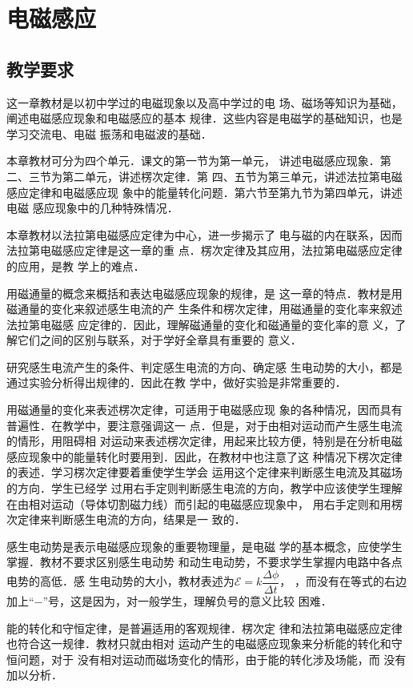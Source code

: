 \chapter{电磁感应}
\minitoc[n]
\section{教学要求}
这一章教材是以初中学过的电磁现象以及高中学过的电
场、磁场等知识为基础，阐述电磁感应现象和电磁感应的基本
规律．这些内容是电磁学的基础知识，也是学习交流电、电磁
振荡和电磁波的基础．

本章教材可分为四个单元．课文的第一节为第一单元，
讲述电磁感应现象．第二、三节为第二单元，讲述楞次定律．第
四、五节为第三单元，讲述法拉第电磁感应定律和电磁感应现
象中的能量转化问题．第六节至第九节为第四单元，讲述电磁
感应现象中的几种特殊情况．

本章教材以法拉第电磁感应定律为中心，进一步揭示了
电与磁的内在联系，因而法拉第电磁感应定律是这一章的重
点．楞次定律及其应用，法拉第电磁感应定律的应用，是教
学上的难点．

用磁通量的概念来概括和表达电磁感应现象的规律，是
这一章的特点．教材是用磁通量的变化来叙述感生电流的产
生条件和楞次定律，用磁通量的变化率来叙述法拉第电磁感
应定律的．因此，理解磁通量的变化和磁通量的变化率的意
义，了解它们之间的区别与联系，对于学好全章具有重要的
意义．

研究感生电流产生的条件、判定感生电流的方向、确定感
生电动势的大小，都是通过实验分析得出规律的．因此在教
学中，做好实验是非常重要的．

用磁通量的变化来表述楞次定律，可适用于电磁感应现
象的各种情况，因而具有普遍性．在教学中，要注意强调这一
点．但是，对于由相对运动而产生感生电流的情形，用阻碍相
对运动来表述楞次定律，用起来比较方便，特别是在分析电磁
感应现象中的能量转化时要用到．因此，在教材中也注意了这
种情况下楞次定律的表述．学习楞次定律要着重使学生学会
运用这个定律来判断感生电流及其磁场的方向．学生已经学
过用右手定则判断感生电流的方向，教学中应该使学生理解
在由相对运动（导体切割磁力线）而引起的电磁感应现象中，
用右手定则和用楞次定律来判断感生电流的方向，结果是一
致的．

感生电动势是表示电磁感应现象的重要物理量，是电磁
学的基本概念，应使学生掌握．教材不要求区别感生电动势
和动生电动势，不要求学生掌握内电路中各点电势的高低．感
生电动势的大小，教材表述为$\mathcal{E}=k\dfrac{\Delta\phi}{\Delta t}$，
，而没有在等式的右边
加上“$-$”号，这是因为，对一般学生，理解负号的意义比较
困难．

能的转化和守恒定律，是普遍适用的客观规律．楞次定
律和法拉第电磁感应定律也符合这一规律．教材只就由相对
运动产生的电磁感应现象来分析能的转化和守恒问题，对于
没有相对运动而磁场变化的情形，由于能的转化涉及场能，而
没有加以分析．

